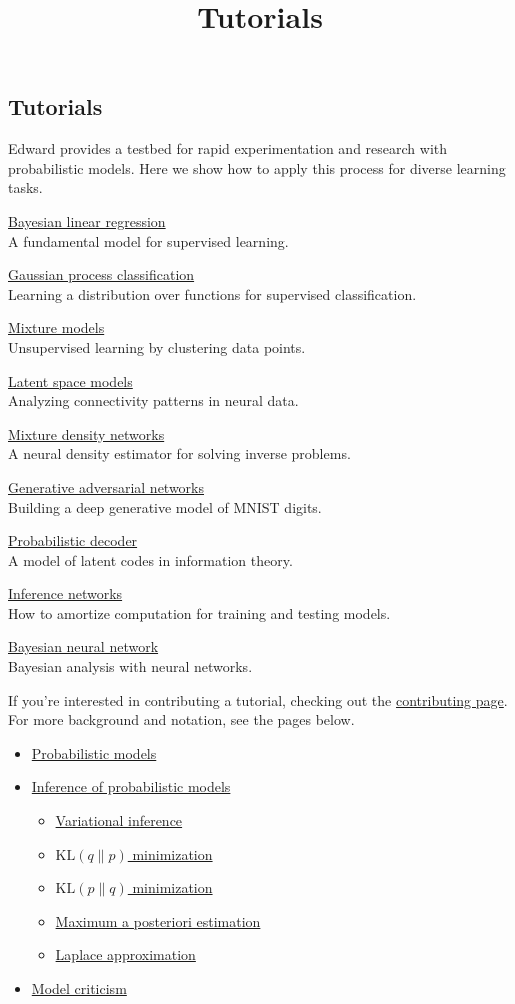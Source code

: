 \title{Tutorials}

\subsection{Tutorials}

Edward provides a testbed for rapid experimentation and research with
probabilistic models. Here we show how to apply this process for
diverse learning tasks.

\href{supervised-regression}{Bayesian linear regression} \\
A fundamental model for supervised learning.

\href{supervised-classification}{Gaussian process classification} \\
Learning a distribution over functions for supervised classification.

\href{unsupervised}{Mixture models} \\
Unsupervised learning by clustering data points.

\href{latent-space-models}{Latent space models} \\
Analyzing connectivity patterns in neural data.

\href{mixture-density-network}{Mixture density networks} \\
A neural density estimator for solving inverse problems.

\href{gan}{Generative adversarial networks} \\
Building a deep generative model of MNIST digits.

\href{decoder}{Probabilistic decoder} \\
A model of latent codes in information theory.

\href{inference-networks}{Inference networks} \\
How to amortize computation for training and testing models.

\href{bayesian-neural-network}{Bayesian neural network} \\
Bayesian analysis with neural networks.

If you're interested in contributing a tutorial, checking out the
\href{/contributing}{contributing page}.
For more background and notation, see the pages below.
\begin{itemize}
  \item \href{model}{Probabilistic models}
  \item \href{inference}{Inference of probabilistic models}
  \begin{itemize}
   \item \href{variational-inference}{Variational inference}
   \item \href{klqp}{$\text{KL}(q\|p)$ minimization}
   \item \href{klpq}{$\text{KL}(p\|q)$ minimization}
   \item \href{map}{Maximum a posteriori estimation}
   \item \href{map-laplace}{Laplace approximation}
  \end{itemize}
  \item \href{criticism}{Model criticism}
\end{itemize}

